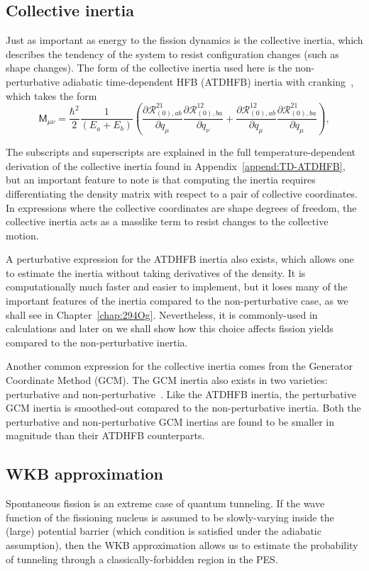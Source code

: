 \subsection{Collective inertia}
Just as important as energy to the fission dynamics is the collective inertia, which describes the tendency of the system to resist configuration changes (such as shape changes). The form of the collective inertia used here is the non-perturbative adiabatic time-dependent HFB (ATDHFB) inertia with cranking~\cite{Baran2011}, which takes the form
\begin{equation}\label{eq:mATDHFB-np}
\mathsf{M}_{\mu\nu} =  \frac{\hbar^2}{2}\frac{1}{(E_a+E_b)}\left(\frac{\partial\mathcal{R}^{21}_{(0),ab}}{\partial q_\mu}\frac{\partial\mathcal{R}^{12}_{(0),ba}}{\partial q_\nu}+\frac{\partial\mathcal{R}^{12}_{(0),ab}}{\partial q_\mu}\frac{\partial\mathcal{R}^{21}_{(0),ba}}{\partial q_\mu}\right),
\end{equation}

\noindent The subscripts and superscripts are explained in the full temperature-dependent derivation of the collective inertia found in Appendix~\ref{append:TD-ATDHFB}, but an important feature to note is that computing the inertia requires differentiating the density matrix with respect to a pair of collective coordinates. In expressions where the collective coordinates are shape degrees of freedom, the collective inertia acts as a masslike term to resist changes to the collective motion.

A perturbative expression for the ATDHFB inertia also exists, which allows one to estimate the inertia without taking derivatives of the density. It is computationally much faster and easier to implement, but it loses many of the important features of the inertia compared to the non-perturbative case, as we shall see in Chapter~\ref{chap:294Og}. Nevertheless, it is commonly-used in calculations and later on we shall show how this choice affects fission yields compared to the non-perturbative inertia.

Another common expression for the collective inertia comes from the Generator Coordinate Method (GCM). The GCM inertia also exists in two varieties: perturbative and non-perturbative~\cite{giuliani2018b}. Like the ATDHFB inertia, the perturbative GCM inertia is smoothed-out compared to the non-perturbative inertia. Both the perturbative and non-perturbative GCM inertias are found to be smaller in magnitude than their ATDHFB counterparts.

\subsection{WKB approximation}\label{sect:wkb}
Spontaneous fission is an extreme case of quantum tunneling. If the wave function of the fissioning nucleus is assumed to be slowly-varying inside the (large) potential barrier (which condition is satisfied under the adiabatic assumption), then the WKB approximation allows us to estimate the probability of tunneling through a classically-forbidden region in the PES.

